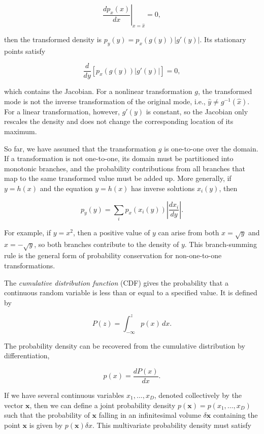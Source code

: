 \documentclass[10pt,twocolumn]{memoir}
\begin{document}
\begin{equation}
    \left.\frac{d p_x(x)}{dx}\right|_{x=\hat{x}} = 0,
\end{equation}

then the transformed density is $p_y(y)=p_x(g(y))|g'(y)|$. Its stationary points satisfy

\begin{equation}
    \frac{d}{dy}\left[p_x(g(y))|g'(y)|\right] = 0,
\end{equation}

which contains the Jacobian. For a nonlinear transformation $g$, the transformed mode is not the inverse transformation of the original mode, i.e., $\hat{y} \ne g^{-1}(\hat{x})$. For a linear transformation, however, $g'(y)$ is constant, so the Jacobian only rescales the density and does not change the corresponding location of its maximum.

So far, we have assumed that the transformation $g$ is one-to-one over the domain. If a transformation is not one-to-one, its domain must be partitioned into monotonic branches, and the probability contributions from all branches that map to the same transformed value must be added up. More generally, if $y=h(x)$ and the equation $y=h(x)$ has inverse solutions $x_i(y)$, then

\begin{equation}
    p_y(y) = \sum_i p_x\left(x_i(y)\right) \left| \frac{dx_i}{dy} \right|.
\end{equation}

For example, if $y=x^2$, then a positive value of $y$ can arise from both $x=\sqrt{y}$ and $x=-\sqrt{y}$, so both branches contribute to the density of $y$. This branch-summing rule is the general form of probability conservation for non-one-to-one transformations.

The \textit{cumulative distribution function} (CDF) gives the probability that a continuous random variable is less than or equal to a specified value. It is defined by

\begin{equation}
    P(z) = \int_{-\infty}^{z} p(x)\,dx.
\end{equation}

The probability density can be recovered from the cumulative distribution by differentiation,

\begin{equation}
    p(x) = \frac{dP(x)}{dx}.
\end{equation}

If we have several continuous variables $x_1,\ldots, x_D$, denoted collectively by the vector $\mathbf{x}$, then we can deﬁne a joint probability density $p(\mathbf{x}) = p(x_1,\ldots, x_D)$ such that the probability of $\mathbf{x}$ falling in an inﬁnitesimal volume $\delta \mathbf{x}$ containing the point $\mathbf{x}$ is given by $p(\mathbf{x})\delta x$. This multivariate probability density must satisfy
\end{document}
